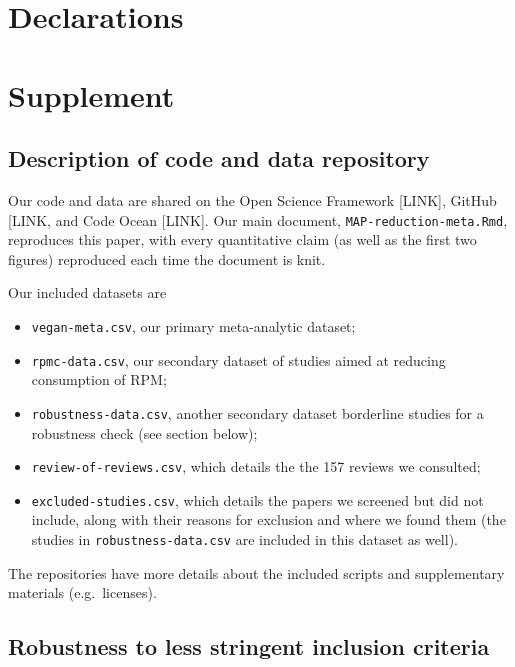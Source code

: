 \documentclass[sn-nature,referee,pdflatex]{sn-jnl}
\begin{document}
\section*{Declarations}\label{declarations}

\section{Supplement}\label{Sec5}

\subsection{Description of code and data
repository}\label{description-of-code-and-data-repository}

Our code and data are shared on the Open Science Framework {[}LINK{]},
GitHub {[}LINK, and Code Ocean {[}LINK{]}. Our main document,
\texttt{MAP-reduction-meta.Rmd}, reproduces this paper, with every
quantitative claim (as well as the first two figures) reproduced each
time the document is knit.

Our included datasets are

\begin{itemize}
\item
  \texttt{vegan-meta.csv}, our primary meta-analytic dataset;
\item
  \texttt{rpmc-data.csv}, our secondary dataset of studies aimed at
  reducing consumption of RPM;
\item
  \texttt{robustness-data.csv}, another secondary dataset borderline
  studies for a robustness check (see section below);
\item
  \texttt{review-of-reviews.csv}, which details the the 157 reviews we
  consulted;
\item
  \texttt{excluded-studies.csv}, which details the papers we screened
  but did not include, along with their reasons for exclusion and where
  we found them (the studies in \texttt{robustness-data.csv} are
  included in this dataset as well).
\end{itemize}

The repositories have more details about the included scripts and
supplementary materials (e.g.~licenses).

\subsection{Robustness to less stringent inclusion
criteria}\label{Sec5.1.1}
\end{document}
